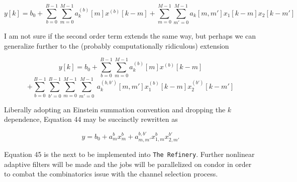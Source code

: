 \documentclass{article}
\begin{document}
\begin{equation}
    y[k] = b_0 + \sum_{b=0}^{B-1}\sum_{m=0}^{M-1} a_k^{(b)}[m] x^{(b)}[k-m]
    + \sum_{m=0}^{M-1}\sum_{m'=0}^{M-1} a_k[m, m']x_1[k-m]x_2[k-m']
\end{equation}

I am not sure if the second order term extends the same way, but perhaps we can
generalize further to the (probably computationally ridiculous) extension

\begin{equation}
    y[k] = b_0 + \sum_{b=0}^{B-1}\sum_{m=0}^{M-1} a_k^{(b)}[m] x^{(b)}[k-m]
    \nonumber
\end{equation}
\begin{equation}
    + \sum_{b=0}^{B-1}\sum_{b'=0}^{B-1}\sum_{m=0}^{M-1}\sum_{m'=0}^{M-1}\ 
    a_k^{(b,b')}[m, m']x_1^{(b)}[k-m]x_2^{(b')}[k-m']
\end{equation}

Liberally adopting an Einstein summation convention and dropping the $k$
dependence, Equation 44 may be succinctly rewritten as

\begin{equation}
    y = b_0 + a_m^b x_m^b + a_{m,m'}^{b,b'}x_{1,m}^b x_{2,m'}^{b'}
\end{equation}

Equation 45 is the next to be implemented into \texttt{The Refinery}. 
Further nonlinear adaptive filters will be made and the jobs will be
parallelized on condor in order to combat the combinatorics
issue with the channel selection process.
\end{document}
